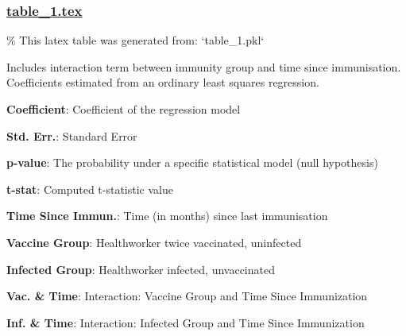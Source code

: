 \documentclass[11pt]{article}
\begin{document}
\subsubsection*{\hyperlink{code-LaTeX Table Design-table-1-tex}{table\_1.tex}}

\begin{codeoutput}
\% This latex table was generated from: `table\_1.pkl`
\begin{table}[h]
\caption{Association Between Time Since Immunisation and Symptom Number}
\label{table:time\_symptoms}
\begin{threeparttable}
\renewcommand{\TPTminimum}{\linewidth}
\begin{tablenotes}
\footnotesize
\item Includes interaction term between immunity group and time since immunisation. Coefficients estimated from an ordinary least squares regression.
\item \textbf{Coefficient}: Coefficient of the regression model
\item \textbf{Std. Err.}: Standard Error
\item \textbf{p-value}: The probability under a specific statistical model (null hypothesis)
\item \textbf{t-stat}: Computed t-statistic value
\item \textbf{Time Since Immun.}: Time (in months) since last immunisation
\item \textbf{Vaccine Group}: Healthworker twice vaccinated, uninfected
\item \textbf{Infected Group}: Healthworker infected, unvaccinated
\item \textbf{Vac. \& Time}: Interaction: Vaccine Group and Time Since Immunization
\item \textbf{Inf. \& Time}: Interaction: Infected Group and Time Since Immunization
\end{tablenotes}
\end{threeparttable}
\end{table}
\end{codeoutput}
\end{document}

